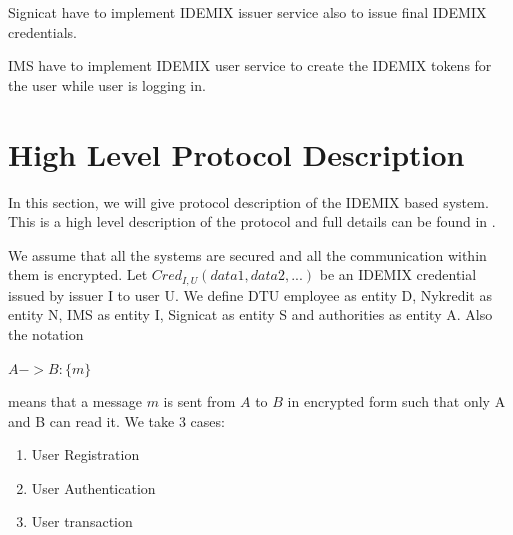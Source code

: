 Signicat have to implement IDEMIX issuer service also to issue final IDEMIX credentials.

IMS have to implement IDEMIX user service to create the IDEMIX tokens for the user while user is logging in.
\section{High Level Protocol Description}
In this section, we will give protocol description of the IDEMIX based system. This is a high level description of the protocol and full details can be found in \cite{camenisch2001efficient}.

We assume that all the systems are secured and all the communication within them is encrypted. Let $Cred_{I,U}(data1,data2,...)$ be an IDEMIX credential issued by issuer I to user U. We define DTU employee as entity D, Nykredit as entity N, IMS as entity I, Signicat as entity S and authorities as entity A. Also the notation
\begin{center}
$A->B : \{m\}$
\end{center}
means that a message $m$ is sent from $A$ to $B$ in encrypted form such that only A and B can read it.
We take 3 cases:

\begin{enumerate}
\item User Registration
\item User Authentication
\item User transaction
\end{enumerate}
	
